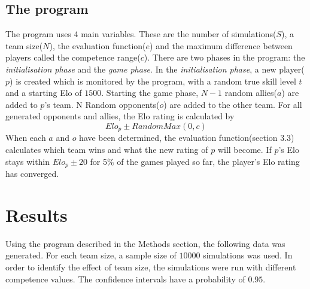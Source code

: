 \documentclass[12pt]{article}
\begin{document}
\subsection{The program}
The program uses 4 main variables. These are the number of simulations($S$), a team size($N$), the evaluation function($e$)  and the maximum difference between players called the competence range($c$). There are two phases in the program: the \textit{initialisation phase} and the \textit{game phase}. In the \textit{initialisation phase}, a new player($p$) is created which is monitored by the program, with a random true skill level $t$  and a starting Elo of $1500$. Starting the game phase, $N - 1$ random allies($a$) are added to $p$’s team. N Random opponents($o$) are added to the other team. For all generated opponents and allies, the Elo rating is calculated by
\[Elo_p \pm RandomMax(0,c)\]
When each $a$ and $o$ have been determined, the evaluation function(section 3.3) calculates which team wins and what the new rating of $p$ will become. If $p$'s Elo stays within $Elo_p \pm 20$ for 5\% of the games played so far, the player's Elo rating has converged.



\section{Results}
Using the program described in the Methods section, the following data was generated.
For each team size, a sample size of $10000$ simulations was used. In order to identify the effect of team size, the simulations were run with different competence values. The confidence intervals have a probability of $0.95$.
\end{document}
